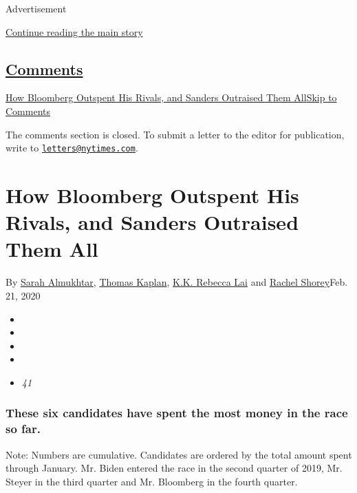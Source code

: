 Advertisement

\protect\hyperlink{after-top}{Continue reading the main story}

\hypertarget{comments}{%
\subsection{\texorpdfstring{\protect\hyperlink{commentsContainer}{Comments}}{Comments}}\label{comments}}

\href{}{How Bloomberg Outspent His Rivals, and Sanders Outraised Them
All}\href{}{Skip to Comments}

The comments section is closed. To submit a letter to the editor for
publication, write to
\href{mailto:letters@nytimes.com}{\nolinkurl{letters@nytimes.com}}.

\hypertarget{how-bloomberg-outspent-his-rivals-and-sanders-outraised-them-all}{%
\section{How Bloomberg Outspent His Rivals, and Sanders Outraised Them
All}\label{how-bloomberg-outspent-his-rivals-and-sanders-outraised-them-all}}

By \href{https://www.nytimes.com/by/sarah-almukhtar}{Sarah Almukhtar},
\href{https://www.nytimes.com/by/thomas-kaplan}{Thomas Kaplan},
\href{https://www.nytimes.com/by/kk-rebecca-lai}{K.K. Rebecca Lai} and
\href{https://www.nytimes.com/by/rachel-shorey}{Rachel Shorey}Feb. 21,
2020

\begin{itemize}
\item
\item
\item
\item
\item
  \emph{41}
\end{itemize}

\hypertarget{these-six-candidates-have-spent-the-most-money-in-the-race-so-far}{%
\subsubsection{These six candidates have spent the most money in the
race so
far.}\label{these-six-candidates-have-spent-the-most-money-in-the-race-so-far}}

Note: Numbers are cumulative. Candidates are ordered by the total amount
spent through January. Mr. Biden entered the race in the second quarter
of 2019, Mr. Steyer in the third quarter and Mr. Bloomberg in the fourth
quarter.

